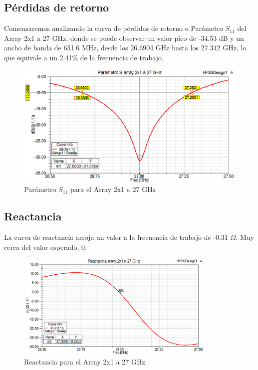 \subsection{Pérdidas de retorno}
\par Comenzaremos analizando la curva de pérdidas de retorno o Parámetro $S_{11}$ del Array 2x1 a 27 GHz, donde se puede observar un valor pico de -34.53 dB y un ancho de banda de 651.6 MHz, desde los 26.6904 GHz hasta los 27.342 GHz, lo que equivale a un 2.41\% de la frecuencia de trabajo.
\\
\begin{figure}[H]
    \centering
        \includegraphics[width=\textwidth]{archivos/analisis/2x13/1}
        \caption{Parámetro $S_{11}$ para el Array 2x1 a 27 GHz}
        \label{fig:s2x13}
\end{figure}

\subsection{Reactancia}
\par La curva de reactancia arroja un valor a la frecuencia de trabajo de -0.31 $\Omega$. Muy cerca del valor esperado, 0.
\\
\begin{figure}[H]
    \centering
        \includegraphics[width=0.85\textwidth]{archivos/analisis/2x13/2}
        \caption{Reactancia para el Array 2x1 a 27 GHz}
        \label{fig:react2x13}
\end{figure}


